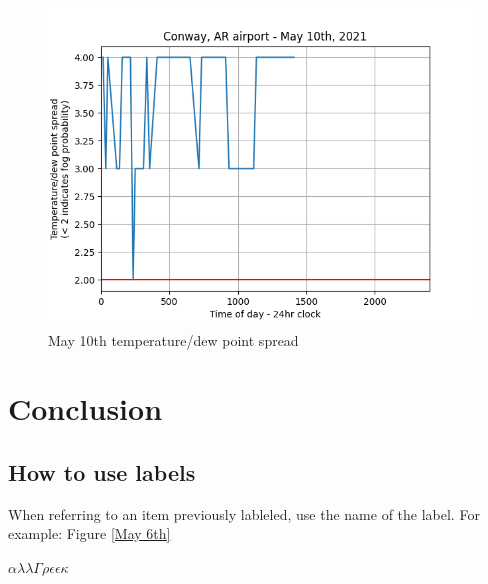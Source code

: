 \documentclass{article}
\begin{document}
\begin{figure}[h]
\begin{center}
\includegraphics[width=1\textwidth]{May10th.png}
\end{center}
\caption{May 10th temperature/dew point spread}
\label{May 10th}
\end{figure}


\section{Conclusion}

\subsection{How to use labels}
When referring to an item previously lableled, use the name of the label. For example: Figure  \ref{May 6th}

$\alpha\lambda\lambda  \Gamma\rho\epsilon\epsilon\kappa$
\end{document}
